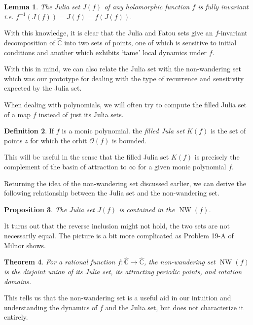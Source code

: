 \documentclass{amsart}
\newcommand{\bbC}{\mathbb{C}}
\newcommand{\orb}{\mathscr{O}}
\newcommand{\bbCS}{\hat{\bbC}}
\newcommand{\NW}{\operatorname{NW}}
\newtheorem{thm}{Theorem}[section]
\newtheorem{prop}[thm]{Proposition}
\newtheorem{lem}[thm]{Lemma}
\theoremstyle{definition}
\newtheorem{defn}[thm]{Definition}
\theoremstyle{remark}
\numberwithin{equation}{section}
\begin{document}
\begin{lem}\cite[Lemma 4.4]{milnor2011}
  The Julia set $J(f)$ of any holomorphic function $f$ is fully invariant i.e. $f^{-1}(J(f))=J(f)=f(J(f))$.
\end{lem}

With this knowledge, it is clear that the Julia and Fatou sets give an $f$-invariant decomposition of $\bbCS$ into two sets of points, one of which is sensitive to initial conditions and another which exhibits `tame' local dynamics under $f$.

With this in mind, we can also relate the Julia set with the non-wandering set which was our prototype for dealing with the type of recurrence and sensitivity expected by the Julia set.

When dealing with polynomials, we will often try to compute the filled Julia set of a map $f$ instead of just its Julia sets.

\begin{defn} If $f$ is a monic polynomial. the \emph{filled Jula set $K(f)$} is the set of points $z$ for which the orbit $\orb(f)$ is bounded.
\end{defn}

This will be useful in the sense that the filled Julia set $K(f)$ is precisely the complement of the basin of attraction to $\infty$ for a given monic polynomial $f$.

Returning the idea of the non-wandering set discussed earlier, we can derive the following relationship between the Julia set and the non-wandering set.

\begin{prop}
  The Julia set $J(f)$ is contained in the $\NW(f)$.
\end{prop}

It turns out that the reverse inclusion might not hold, the two sets are not necessarily equal. The picture is a bit more complicated as Problem 19-A of Milnor \cite{milnor2011} shows.

\begin{thm}\cite[Problem 19-A]{milnor2011}
For a rational function $f\colon \bbCS\to \bbCS$, the non-wandering set $\NW(f)$ is the disjoint union of its Julia set, its attracting periodic points, and rotation domains.
\end{thm}

This tells us that the non-wandering set is a useful aid in our intuition and understanding the dynamics of $f$ and the Julia set, but does not characterize it entirely.
\end{document}

